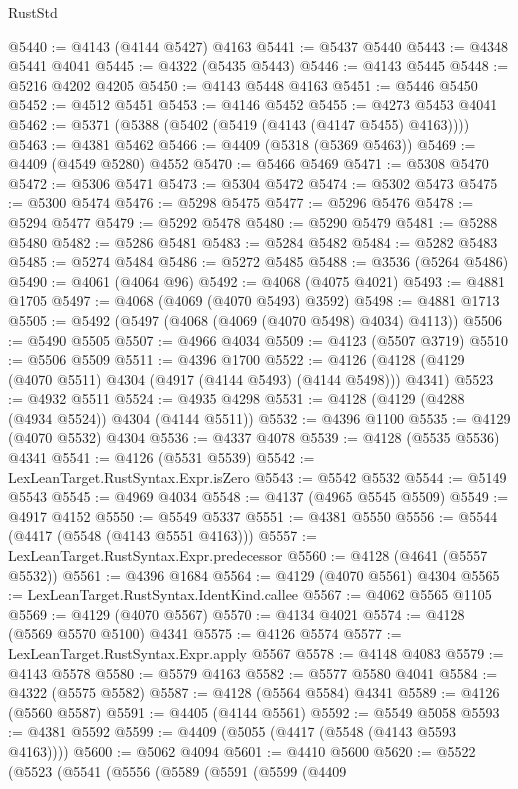 \begin{lexlean}{RustStd}
\begin{coremodule}
@5440 := @4143 (@4144 @5427) @4163
@5441 := @5437 @5440
@5443 := @4348 @5441 @4041
@5445 := @4322 (@5435 @5443)
@5446 := @4143 @5445
@5448 := @5216 @4202 @4205
@5450 := @4143 @5448 @4163
@5451 := @5446 @5450
@5452 := @4512 @5451
@5453 := @4146 @5452
@5455 := @4273 @5453 @4041
@5462 := @5371 (@5388 (@5402 (@5419 (@4143 (@4147 @5455) @4163))))
@5463 := @4381 @5462
@5466 := @4409 (@5318 (@5369 @5463))
@5469 := @4409 (@4549 @5280) @4552
@5470 := @5466 @5469
@5471 := @5308 @5470
@5472 := @5306 @5471
@5473 := @5304 @5472
@5474 := @5302 @5473
@5475 := @5300 @5474
@5476 := @5298 @5475
@5477 := @5296 @5476
@5478 := @5294 @5477
@5479 := @5292 @5478
@5480 := @5290 @5479
@5481 := @5288 @5480
@5482 := @5286 @5481
@5483 := @5284 @5482
@5484 := @5282 @5483
@5485 := @5274 @5484
@5486 := @5272 @5485
@5488 := @3536 (@5264 @5486)
@5490 := @4061 (@4064 @96)
@5492 := @4068 (@4075 @4021)
@5493 := @4881 @1705
@5497 := @4068 (@4069 (@4070 @5493) @3592)
@5498 := @4881 @1713
@5505 := @5492 (@5497 (@4068 (@4069 (@4070 @5498) @4034) @4113))
@5506 := @5490 @5505
@5507 := @4966 @4034
@5509 := @4123 (@5507 @3719)
@5510 := @5506 @5509
@5511 := @4396 @1700
@5522 := @4126 (@4128 (@4129 (@4070 @5511) @4304 (@4917 (@4144 @5493) (@4144 @5498))) @4341)
@5523 := @4932 @5511
@5524 := @4935 @4298
@5531 := @4128 (@4129 (@4288 (@4934 @5524)) @4304 (@4144 @5511))
@5532 := @4396 @1100
@5535 := @4129 (@4070 @5532) @4304
@5536 := @4337 @4078
@5539 := @4128 (@5535 @5536) @4341
@5541 := @4126 (@5531 @5539)
@5542 := LexLeanTarget.RustSyntax.Expr.isZero
@5543 := @5542 @5532
@5544 := @5149 @5543
@5545 := @4969 @4034
@5548 := @4137 (@4965 @5545 @5509)
@5549 := @4917 @4152
@5550 := @5549 @5337
@5551 := @4381 @5550
@5556 := @5544 (@4417 (@5548 (@4143 @5551 @4163)))
@5557 := LexLeanTarget.RustSyntax.Expr.predecessor
@5560 := @4128 (@4641 (@5557 @5532))
@5561 := @4396 @1684
@5564 := @4129 (@4070 @5561) @4304
@5565 := LexLeanTarget.RustSyntax.IdentKind.callee
@5567 := @4062 @5565 @1105
@5569 := @4129 (@4070 @5567)
@5570 := @4134 @4021
@5574 := @4128 (@5569 @5570 @5100) @4341
@5575 := @4126 @5574
@5577 := LexLeanTarget.RustSyntax.Expr.apply @5567
@5578 := @4148 @4083
@5579 := @4143 @5578
@5580 := @5579 @4163
@5582 := @5577 @5580 @4041
@5584 := @4322 (@5575 @5582)
@5587 := @4128 (@5564 @5584) @4341
@5589 := @4126 (@5560 @5587)
@5591 := @4405 (@4144 @5561)
@5592 := @5549 @5058
@5593 := @4381 @5592
@5599 := @4409 (@5055 (@4417 (@5548 (@4143 @5593 @4163))))
@5600 := @5062 @4094
@5601 := @4410 @5600
@5620 := @5522
    (@5523
      (@5541
        (@5556
          (@5589
            (@5591
              (@5599
                (@4409

\end{coremodule}
\end{lexlean}
